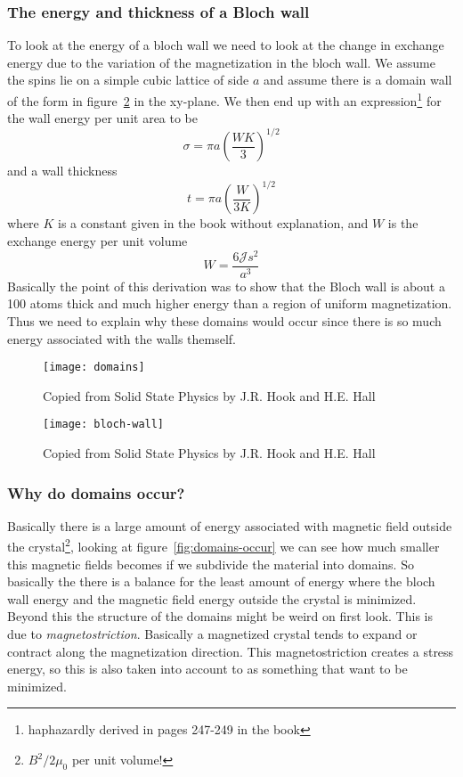 \documentclass[11pt]{article}
\begin{document}
\subsubsection{The energy and thickness of a Bloch wall}
To look at the energy of a bloch wall we need to look at the change in exchange energy due to the variation of the magnetization in the bloch wall. We assume the spins lie on a simple cubic lattice of side $a$ and assume there is a domain wall of the form in figure~\ref{fig:bloch-wall} in the xy-plane. We then end up with an expression\footnote{haphazardly derived in pages 247-249 in the book} for the wall energy per unit area to be
\begin{equation}
	\sigma = \pi a (\frac{WK}{3})^{1/2}
\end{equation}
and a wall thickness 
\begin{equation}
	t = \pi a (\frac{W}{3K})^{1/2}
\end{equation}
where $K$ is a constant given in the book without explanation, and $W$ is the exchange energy per unit volume
\begin{equation}
	W = \frac{6\mathscr{J} s^2}{a^3}
\end{equation}
Basically the point of this derivation was to show that the Bloch wall is about a 100 atoms thick and much higher energy than a region of uniform magnetization. Thus we need to explain why these domains would occur since there is so much energy associated with the walls themself. 

\newpage
\begin{figure}[!ht]
	\centering
	\texttt{[image: domains]}
	\caption{Copied from Solid State Physics by J.R. Hook and H.E. Hall}
	\label{fig:domains}
\end{figure}
\newpage

\begin{figure}[!ht]
	\centering
	\texttt{[image: bloch-wall]}
	\caption{Copied from Solid State Physics by J.R. Hook and H.E. Hall}
	\label{fig:bloch-wall}
\end{figure}

\newpage
\subsubsection{Why do domains occur?}
Basically there is a large amount of energy associated with magnetic field outside the crystal\footnote{$B^2/2\mu_0$ per unit volume!}, looking at figure~\ref{fig:domains-occur} we can see how much smaller this magnetic fields becomes if we subdivide the material into domains. So basically the there is a balance for the least amount of energy where the bloch wall energy and the magnetic field energy outside the crystal is minimized. Beyond this the structure of the domains might be weird on first look. This is due to \emph{magnetostriction}. Basically a magnetized crystal tends to expand or contract along the magnetization direction. This magnetostriction creates a stress energy, so this is also taken into account to as something that want to be minimized.
\end{document}
